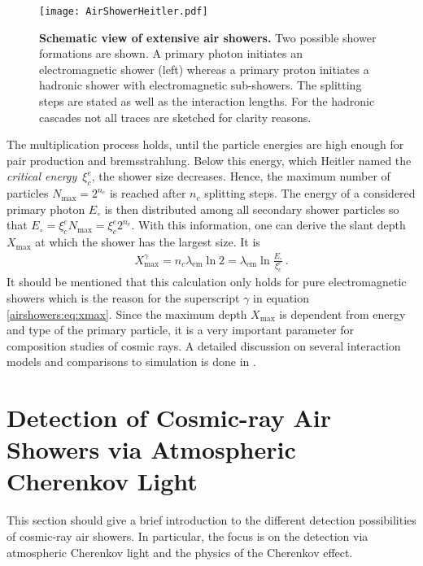 \begin{figure}[H]
	\texttt{[image: AirShowerHeitler.pdf]}
	\caption[Schematic view of extensive air showers]{\textbf{Schematic view of extensive air showers.} \cite{famous:niggemann} Two possible shower formations are shown. A primary photon initiates an electromagnetic shower (left) whereas a primary proton initiates a hadronic shower with electromagnetic sub-showers. The splitting steps are stated as well as the interaction lengths. For the hadronic cascades not all traces are sketched for clarity reasons.}	
	\label{airshowers:cascades}
\end{figure}

The multiplication process holds, until the particle energies are high enough for pair production and bremsstrahlung. Below this energy, which Heitler named the \textit{critical energy}~$\xi_c^e$, the shower size decreases. Hence, the maximum number of particles $N_\text{max} = 2^{n_c}$ is reached after $n_c$ splitting steps. The energy of a considered primary photon $E_\circ$ is then distributed among all secondary shower particles so that $E_\circ = \xi_c^e N_\text{max} = \xi_c^e 2^{n_c}$. With this information, one can derive the slant depth $X_\text{max}$ at which the shower has the largest size. It is
\begin{align}
	X_\text{max}^\gamma = n_c\lambda_\text{em}\ln{2} = \lambda_\text{em}\ln{\frac{E_\circ}{\xi_c^e}}\,.
	\label{airshowers:eq:xmax}
\end{align}
It should be mentioned that this calculation only holds for pure electromagnetic showers which is the reason for the superscript $\gamma$ in equation \eqref{airshowers:eq:xmax}. \cite{airshowers:heitlermodel}
Since the maximum depth $X_\text{max}$ is dependent from energy and type of the primary particle, it is a very important parameter for composition studies of cosmic rays. A detailed discussion on several interaction models and comparisons to simulation is done in \cite{airshowers:heitlermodel}.

\section{Detection of Cosmic-ray Air Showers via Atmospheric Cherenkov Light}\label{sec:cherenkov}

This section should give a brief introduction to the different detection possibilities of cosmic-ray air showers. In particular, the focus is on the detection via atmospheric Cherenkov light and the physics of the Cherenkov effect.


